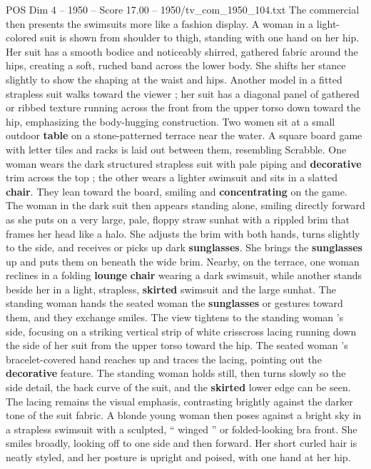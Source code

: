 \begin{textsample}{POS Dim 4 – 1950 – Score 17.00 – 1950/tv\_com\_1950\_104.txt}
The commercial then presents the swimsuits more like a fashion display.
A woman in a light-colored suit is shown from shoulder to thigh, standing with one hand on her hip.
Her suit has a smooth bodice and noticeably shirred, gathered fabric around the hips, creating a soft, ruched band across the lower body.
She shifts her stance slightly to show the shaping at the waist and hips.
Another model in a fitted strapless suit walks toward the viewer ; her suit has a diagonal panel of gathered or ribbed texture running across the front from the upper torso down toward the hip, emphasizing the body-hugging construction.
Two women sit at a small outdoor \textbf{table} on a stone-patterned terrace near the water.
A square board game with letter tiles and racks is laid out between them, resembling Scrabble.
One woman wears the dark structured strapless suit with pale piping and \textbf{decorative} trim across the top ; the other wears a lighter swimsuit and sits in a slatted \textbf{chair}.
They lean toward the board, smiling and \textbf{concentrating} on the game.
The woman in the dark suit then appears standing alone, smiling directly forward as she puts on a very large, pale, floppy straw sunhat with a rippled brim that frames her head like a halo.
She adjusts the brim with both hands, turns slightly to the side, and receives or picks up dark \textbf{sunglasses}.
She brings the \textbf{sunglasses} up and puts them on beneath the wide brim.
Nearby, on the terrace, one woman reclines in a folding \textbf{lounge} \textbf{chair} wearing a dark swimsuit, while another stands beside her in a light, strapless, \textbf{skirted} swimsuit and the large sunhat.
The standing woman hands the seated woman the \textbf{sunglasses} or gestures toward them, and they exchange smiles.
The view tightens to the standing woman ’s side, focusing on a striking vertical strip of white crisscross lacing running down the side of her suit from the upper torso toward the hip.
The seated woman ’s bracelet-covered hand reaches up and traces the lacing, pointing out the \textbf{decorative} feature.
The standing woman holds still, then turns slowly so the side detail, the back curve of the suit, and the \textbf{skirted} lower edge can be seen.
The lacing remains the visual emphasis, contrasting brightly against the darker tone of the suit fabric.
A blonde young woman then poses against a bright sky in a strapless swimsuit with a sculpted, “ winged ” or folded-looking bra front.
She smiles broadly, looking off to one side and then forward.
Her short curled hair is neatly styled, and her posture is upright and poised, with one hand at her hip.

\end{textsample}
